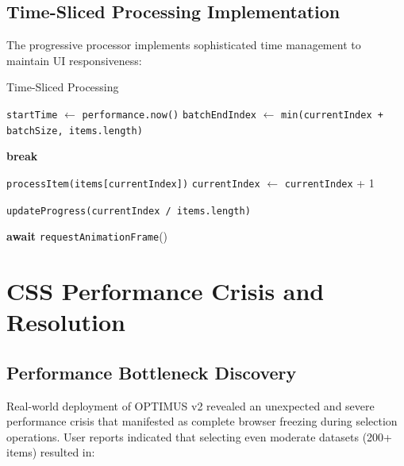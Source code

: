 \documentclass[10pt]{article}
\begin{document}
\subsection{Time-Sliced Processing Implementation}

The progressive processor implements sophisticated time management to maintain UI responsiveness:

\begin{algorithm}[H]
\caption{Time-Sliced Processing}
\label{algo:time-slicing}
\begin{algorithmic}[1]
        \State \texttt{startTime} $\gets$ \texttt{performance.now()}
        \State \texttt{batchEndIndex} $\gets$ 
        \State \quad \texttt{min(currentIndex + batchSize, items.length)}
        
                \State \textbf{break} 
            \EndIf
            
            \State \texttt{processItem(items[currentIndex])}
            \State \texttt{currentIndex} $\gets$ \texttt{currentIndex} + 1
        \EndWhile
        
        \State \texttt{updateProgress(currentIndex / items.length)}
        
            \State \textbf{await} \texttt{requestAnimationFrame}() 
        \EndIf
    \EndWhile
\EndFunction
\end{algorithmic}
\end{algorithm}

\section{CSS Performance Crisis and Resolution}

\subsection{Performance Bottleneck Discovery}

Real-world deployment of OPTIMUS v2 revealed an unexpected and severe performance crisis that manifested as complete browser freezing during selection operations. User reports indicated that selecting even moderate datasets (200+ items) resulted in:
\end{document}

